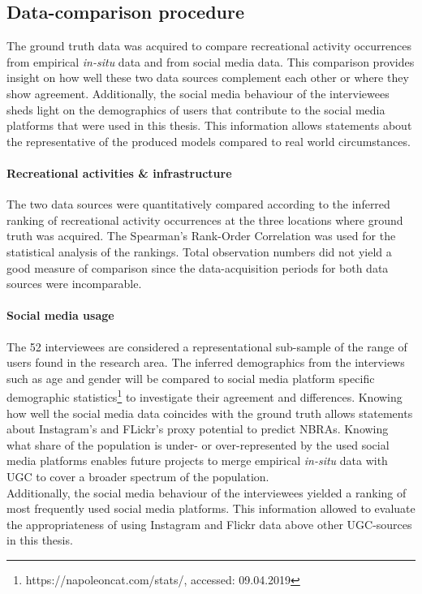 \subsection{Data-comparison procedure}
The ground truth data was acquired to compare recreational activity occurrences from empirical \textit{in-situ} data and from social media data. This comparison provides insight on how well these two data sources complement each other or where they show agreement. Additionally, the social media behaviour of the interviewees sheds light on the demographics of users that contribute to the social media platforms that were used in this thesis. This information allows statements about the representative of the produced models compared to real world circumstances.

\paragraph*{Recreational activities \& infrastructure}
The two data sources were quantitatively compared according to the inferred ranking of recreational activity occurrences at the three locations where ground truth was acquired. The Spearman's Rank-Order Correlation was used for the statistical analysis of the rankings. Total observation numbers did not yield a good measure of comparison since the data-acquisition periods for both data sources were incomparable. 

\paragraph*{Social media usage}
The 52 interviewees are considered a representational sub-sample of the range of users found in the research area. The inferred demographics from the interviews such as age and gender will be compared to social media platform specific demographic statistics\footnote{https://napoleoncat.com/stats/, accessed: 09.04.2019} to investigate their agreement and differences. Knowing how well the social media data coincides with the ground truth allows statements about Instagram's and FLickr's proxy potential to predict NBRAs. Knowing what share of the population is under- or over-represented by the used social media platforms enables future projects to merge empirical \textit{in-situ} data with UGC to cover a broader spectrum of the population.\\
Additionally, the social media behaviour of the interviewees yielded a ranking of most frequently used social media platforms. This information allowed to evaluate the appropriateness of using Instagram and Flickr data above other UGC-sources in this thesis.

